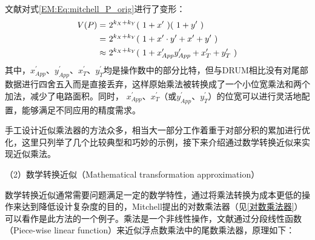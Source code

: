 文献\cite{AC:AM:TOSAM}对式\eqref{EM:Eq:mitchell_P_orig}进行了变形：
\begin{align}
    V(P) = & \ 2^{k_X + k_Y} ( \ 1 + x^{\prime} \ ) ( \ 1 + y^{\prime} \ ) \notag \\
         = & \ 2^{k_X + k_Y} ( \ 1 + x^{\prime} \cdot y^{\prime} + x^{\prime} + y^{\prime} \ ) \notag \\
         \approx & \ 2^{k_X + k_Y} ( \ 1 + x^{\prime}_{App} y^{\prime}_{App} + x^{\prime}_T + y^{\prime}_T \ )
\label{AC:AM:Eq:TOSAM}
\end{align}
其中，$x^{\prime}_{App}$、$y^{\prime}_{App}$、$x^{\prime}_T$、$y^{\prime}_T$均是操作数中的部分比特，但与DRUM相比没有对尾部数据进行四舍五入而是直接丢弃，这样原始乘法被转换成了一个小位宽乘法和两个加法，减少了电路面积。同时，
$x^{\prime}_{App}$、$x^{\prime}_T$（或$y^{\prime}_{App}$、$y^{\prime}_T$）的位宽可以进行灵活地配置，能够满足不同应用的精度需求。

手工设计近似乘法器的方法众多，相当大一部分工作着重于对部分积的累加进行优化，这里只列举了几个比较典型和巧妙的示例，接下来介绍通过数学转换近似来实现近似乘法。

（2）数学转换近似（Mathematical transformation approximation）

数学转换近似通常需要问题满足一定的数学特性，通过将乘法转换为成本更低的操作来达到降低设计复杂度的目的，Mitchell提出的对数乘法器\cite{EM:mitchell}（见\ref{对数乘法器}）可以看作是此方法的一个例子。乘法是一个非线性操作，文献\cite{AC:AM:OU}通过分段线性函数（Piece-wise linear function）来近似浮点数乘法中的尾数乘法器，原理如下：

